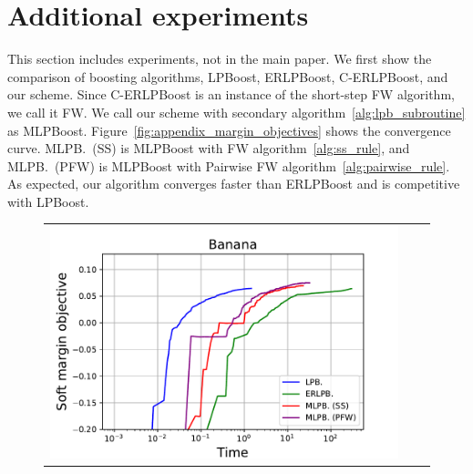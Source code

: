 \section{Additional experiments}
\label{sec:appendix_experiemnt}
This section includes experiments, not in the main paper. 
We first show the comparison of boosting algorithms, 
LPBoost, ERLPBoost, C-ERLPBoost, and our scheme. 
Since C-ERLPBoost is an instance of the short-step FW algorithm, 
we call it FW. 
We call our scheme with secondary algorithm~\ref{alg:lpb_subroutine} 
as MLPBoost. 
Figure~\ref{fig:appendix_margin_objectives} shows the convergence curve. 
MLPB.~(SS) is MLPBoost with FW algorithm~\ref{alg:ss_rule}, 
and MLPB.~(PFW) is MLPBoost 
with Pairwise FW algorithm~\ref{alg:pairwise_rule}. 
As expected, our algorithm converges faster than ERLPBoost 
and is competitive with LPBoost. 
\begin{figure}[p]
    \centering
    \begin{tabular}{ccc}
        \begin{minipage}[t]{0.31\hsize}
            \centering
            \includegraphics[keepaspectratio, scale=0.30]
            {figure/curve_logtime_banana.pdf}
        \end{minipage}
        &
        \begin{minipage}[t]{0.31\hsize}
            \centering
            \includegraphics[keepaspectratio, scale=0.30]

\end{minipage}
\end{tabular}
\end{figure}
